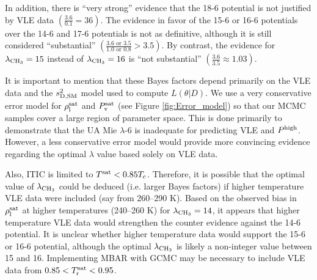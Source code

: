 \documentclass[preprint,letterpaper,floatfix,citeautoscript,aip,jcp]{revtex4-1}
\begin{document}

In addition, there is ``very strong'' evidence that the 18-6 potential is not justified by VLE data $\left(\frac{3.6}{0.1} = 36\right)$. The evidence in favor of the 15-6 or 16-6 potentials over the 14-6 and 17-6 potentials is not as definitive, although it is still considered ``substantial'' $\left(\frac{3.6 \text{ or } 3.5}{1.0 \text{ or } 0.8} > 3.5\right)$. By contrast, the evidence for $\lambda_{\rm CH_3} = 15$ instead of $\lambda_{\rm CH_3} = 16$ is ``not substantial'' $\left(\frac{3.6}{3.5} \approx 1.03\right)$.

It is important to mention that these Bayes factors depend primarily on the VLE data and the $s^2_{\rm D,SM}$ model used to compute $L(\theta|D)$. We use a very conservative error model for $\rho_{\rm l}^{\rm sat}$ and $P_{\rm v}^{\rm sat}$ (see Figure \ref{fig:Error_model}) so that our MCMC samples cover a large region of parameter space. This is done primarily to demonstrate that the UA Mie $\lambda$-6 is inadequate for predicting VLE and $P^{\rm high}$. However, a less conservative error model would provide more convincing evidence regarding the optimal $\lambda$ value based solely on VLE data. 

Also, ITIC is limited to $T^{\rm sat} < 0.85 T_{\rm c}$. Therefore, it is possible that the optimal value of $\lambda_{\rm CH_3}$ could be deduced (i.e. larger Bayes factors) if higher temperature VLE data were included (say from 260--290 K). Based on the observed bias in $\rho_{\rm l}^{\rm sat}$ at higher temperatures (240--260 K) for $\lambda_{\rm CH_3} = 14$, it appears that higher temperature VLE data would strengthen the counter evidence against the 14-6 potential. It is unclear whether higher temperature data would support the 15-6 or 16-6 potential, although the optimal $\lambda_{\rm CH_3}$ is likely a non-integer value between 15 and 16. 
Implementing MBAR with GCMC may be necessary to include VLE data from $0.85 < T_{\rm r}^{\rm sat} < 0.95$.
\end{document}

